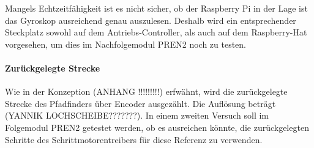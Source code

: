 \documentclass[main.tex]{subfiles} %
\begin{document}
Mangels Echtzeitfähigkeit ist es nicht sicher, ob der Raspberry Pi in der Lage
ist das Gyroskop ausreichend genau auszulesen. Deshalb wird ein entsprechender
Steckplatz sowohl auf dem Antriebs-Controller, als auch auf dem Raspberry-Hat
vorgesehen, um dies im Nachfolgemodul PREN2 noch zu testen.

\paragraph{Zurückgelegte Strecke}
Wie in der Konzeption (ANHANG !!!!!!!!!) erfwähnt, wird die zurückgelegte
Strecke des Pfadfinders über Encoder ausgezählt. Die Auflösung beträgt (YANNIK
LOCHSCHEIBE???????). In einem zweiten Versuch soll im Folgemodul PREN2 getestet
werden, ob es ausreichen könnte, die zurückgelegten Schritte des
Schrittmotorentreibers für diese Referenz zu verwenden.
\end{document}
